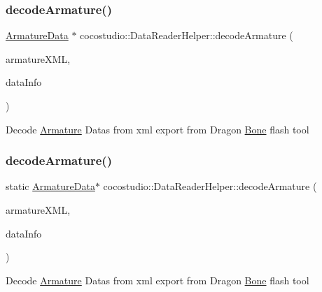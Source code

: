 \subsubsection{\texorpdfstring{decode\+Armature()}{decodeArmature()}\hspace{0.1cm}{\footnotesize\ttfamily [1/2]}}
{\footnotesize\ttfamily \hyperlink{classcocostudio_1_1ArmatureData}{Armature\+Data} $\ast$ cocostudio\+::\+Data\+Reader\+Helper\+::decode\+Armature (\begin{DoxyParamCaption}\item[{\hyperlink{classtinyxml2_1_1XMLElement}{tinyxml2\+::\+X\+M\+L\+Element} $\ast$}]{armature\+X\+ML,  }\item[{\hyperlink{structcocostudio_1_1DataReaderHelper_1_1__DataInfo}{Data\+Info} $\ast$}]{data\+Info }\end{DoxyParamCaption})\hspace{0.3cm}{\ttfamily [static]}}

Decode \hyperlink{classcocostudio_1_1Armature}{Armature} Datas from xml export from Dragon \hyperlink{classcocostudio_1_1Bone}{Bone} flash tool \mbox{\label{classcocostudio_1_1DataReaderHelper_a5b20054132aa72382e5e3091dc51800d}} 
\subsubsection{\texorpdfstring{decode\+Armature()}{decodeArmature()}\hspace{0.1cm}{\footnotesize\ttfamily [2/2]}}
{\footnotesize\ttfamily static \hyperlink{classcocostudio_1_1ArmatureData}{Armature\+Data}$\ast$ cocostudio\+::\+Data\+Reader\+Helper\+::decode\+Armature (\begin{DoxyParamCaption}\item[{\hyperlink{classtinyxml2_1_1XMLElement}{tinyxml2\+::\+X\+M\+L\+Element} $\ast$}]{armature\+X\+ML,  }\item[{\hyperlink{structcocostudio_1_1DataReaderHelper_1_1__DataInfo}{Data\+Info} $\ast$}]{data\+Info }\end{DoxyParamCaption})\hspace{0.3cm}{\ttfamily [static]}}

Decode \hyperlink{classcocostudio_1_1Armature}{Armature} Datas from xml export from Dragon \hyperlink{classcocostudio_1_1Bone}{Bone} flash tool \mbox{\label{classcocostudio_1_1DataReaderHelper_ad5f702d54a02315ac7d4f4d5dfdd3464}} 
